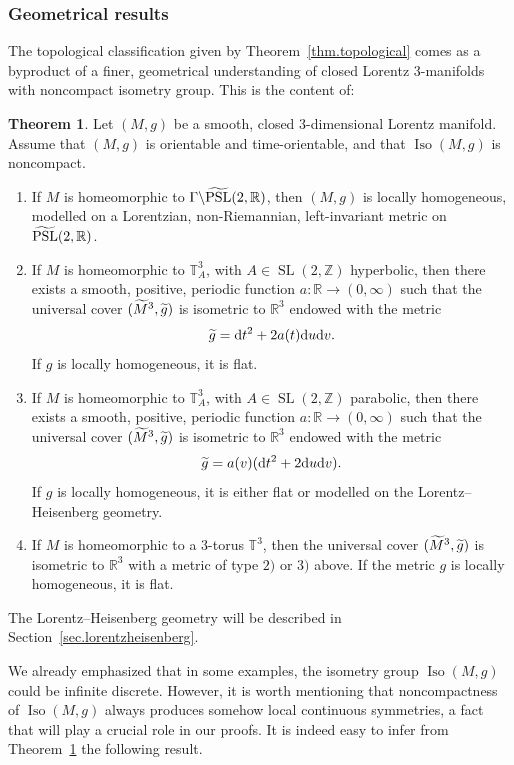 \documentclass[11pt]{article}
\theoremstyle{definition}
\numberwithin{equation}{section}
\numberwithin{figure}{section}
\numberwithin{table}{section}
\newtheorem{thmx}{Theorem}
\DeclareMathOperator{\Iso}{Iso}
\DeclareMathOperator{\PSL}{PSL}
\DeclareMathOperator{\SL}{SL}
\newcommand*\TT{\mathbb{T}}
\newcommand*\RR{\mathbb{R}}
\newcommand*\ZZ{\mathbb{Z}}
\let\oldtilde\tilde
\renewcommand*\tilde[1]{\mathchoice{\widetilde{#1}}{\widetilde{#1}}{\widetilde{#1}}{\oldtilde{#1}}}
\newcommand*{\dd}{\mathrm{d}}
\newcommand*{\dt}{\dd t}
\newcommand*{\du}{\dd u}
\newcommand*{\dv}{\dd v}
\begin{document}
\subsubsection{Geometrical results}
The topological classification given by Theorem~\ref{thm.topological} comes as a byproduct of a finer, geometrical understanding of closed Lorentz $3$-manifolds with noncompact isometry group. This is the content of:

\begin{thmx}\label{thm.geometrical}
Let $(M,g)$ be a smooth, closed $3$-dimensional Lorentz manifold. Assume that $(M,g)$ is orientable and time-orientable, and that $\Iso(M,g)$ is noncompact.
\begin{enumerate}
\item \label{list3.1}If $M$ is homeomorphic to $\Gamma \backslash
\tilde{\PSL}(2,\RR)$, then $(M,g)$ is locally homogeneous, modelled on a Lorentzian, non-Riemannian, left-invariant metric on $\tilde{\PSL}(2,\RR)$.
\item \label{list3.2}If $M$ is homeomorphic to $\TT_A^3$, with $A \in \SL(2,\ZZ)$ hyperbolic, then there exists a smooth, positive, periodic function $a:\RR \to (0,\infty)$ such that the universal cover $(\tilde{M}^3,{\tilde{g}})$ is isometric to $\RR^3$ endowed with the metric
\[
{\tilde{g}}=\dt^2+2a(t)\du\dv.
\]
If $g$ is locally homogeneous, it is flat.
\item \label{list3.3}If $M$ is homeomorphic to $\TT_A^3$, with $A \in \SL(2,\ZZ)$ parabolic, then there exists a smooth, positive, periodic function $a:\RR \to (0,\infty)$ such that the universal cover $(\tilde{M}^3,{\tilde{g}})$ is isometric to $\RR^3$ endowed with the metric
\[
{\tilde{g}}=a(v)(\dt^2+2\du\dv).
\]
If $g$ is locally homogeneous, it is either flat or modelled on the Lorentz--Heisenberg geometry.
\item \label{list3.4}If $M$ is homeomorphic to a $3$-torus $\TT^3$, then the universal cover $(\tilde{M}^3,{\tilde{g}})$ is isometric to $\RR^3$ with a metric of type $2)$ or $3)$ above. If the metric $g$ is locally homogeneous, it is flat.
\end{enumerate}
\end{thmx}

The Lorentz--Heisenberg geometry will be described in Section~\ref{sec.lorentzheisenberg}.


We already emphasized that in some examples, the isometry group $\Iso(M,g)$ could be infinite discrete. However, it is worth mentioning that noncompactness of $\Iso(M,g)$ always produces somehow local continuous symmetries, a fact that will play a crucial role in our proofs. It is indeed easy to infer from Theorem~\ref{thm.geometrical} the following result.
\end{document}
